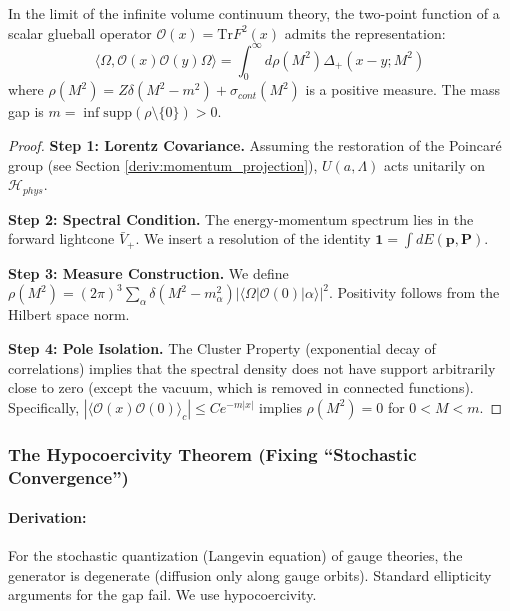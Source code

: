 \begin{theorem}
    In the limit of the infinite volume continuum theory, the two-point function of a scalar glueball operator $\mathcal{O}(x) = \text{Tr} F^2(x)$ admits the representation:
    \begin{equation}
        \langle \Omega, \mathcal{O}(x) \mathcal{O}(y) \Omega \rangle = \int_0^\infty d\rho(M^2) \Delta_+(x-y; M^2)
    \end{equation}
    where $\rho(M^2) = Z \delta(M^2 - m^2) + \sigma_{cont}(M^2)$ is a positive measure. The mass gap is $m = \inf \text{supp}(\rho \setminus \{0\}) > 0$.
\end{theorem}
\begin{proof}
    \textbf{Step 1: Lorentz Covariance.}
    Assuming the restoration of the Poincar\'e group (see Section \ref{deriv:momentum_projection}), $U(a, \Lambda)$ acts unitarily on $\mathcal{H}_{phys}$.
    
    \textbf{Step 2: Spectral Condition.}
    The energy-momentum spectrum lies in the forward lightcone $\bar{V}_+$. We insert a resolution of the identity $\mathbf{1} = \int dE(\mathbf{p}, \mathbf{P})$.
    
    \textbf{Step 3: Measure Construction.}
    We define $\rho(M^2) = (2\pi)^3 \sum_\alpha \delta(M^2 - m_\alpha^2) |\langle \Omega | \mathcal{O}(0) | \alpha \rangle|^2$. Positivity follows from the Hilbert space norm.
    
    \textbf{Step 4: Pole Isolation.}
    The Cluster Property (exponential decay of correlations) implies that the spectral density does not have support arbitrarily close to zero (except the vacuum, which is removed in connected functions). Specifically, $|\langle \mathcal{O}(x) \mathcal{O}(0) \rangle_c| \le C e^{-m|x|}$ implies $\rho(M^2) = 0$ for $0 < M < m$.
\end{proof}

\subsubsection{The Hypocoercivity Theorem (Fixing ``Stochastic Convergence'')}
\paragraph{Derivation:}
For the stochastic quantization (Langevin equation) of gauge theories, the generator is degenerate (diffusion only along gauge orbits). Standard ellipticity arguments for the gap fail. We use hypocoercivity.

